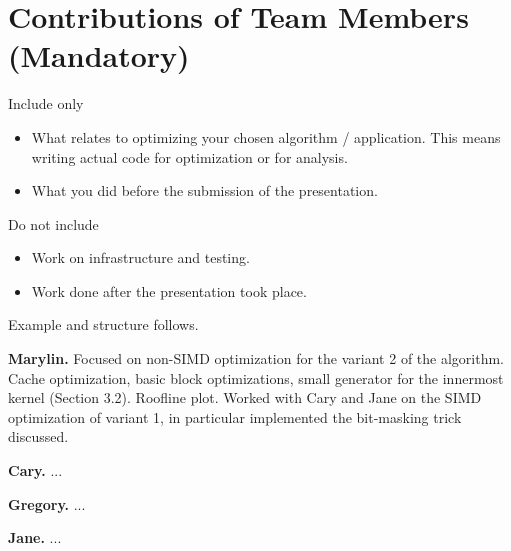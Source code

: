 \documentclass{article}
\newcommand{\mypar}[1]{{\bf #1.}}
\begin{document}
\section{Contributions of Team Members (Mandatory)}

Include only 
\begin{itemize}
	\item What relates to optimizing your chosen algorithm / application. This means writing actual code for optimization or for analysis.
	\item What you did before the submission of the presentation.
\end{itemize}
Do not include
\begin{itemize}
	\item Work on infrastructure and testing.
	\item Work done after the presentation took place.
\end{itemize}

Example and structure follows.

\mypar{Marylin} Focused on non-SIMD optimization for the variant 2 of the algorithm. Cache optimization, basic block optimizations, small generator for the innermost kernel (Section 3.2). Roofline plot. Worked with Cary and Jane on the SIMD optimization of variant 1, in particular implemented the bit-masking trick discussed.

\mypar{Cary} ...

\mypar{Gregory} ...

\mypar{Jane} ...



\end{document}
